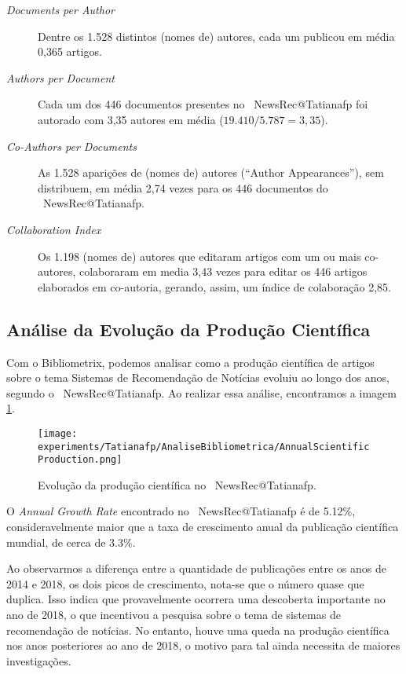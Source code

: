 \begin{description}
    \item [\textit{Documents per Author}] Dentre os 1.528 distintos (nomes de) autores, cada um publicou em média 0,365 artigos.
    \item [\textit{Authors per Document}] Cada um dos 446 documentos presentes no \dataset\   NewsRec@Tatianafp foi autorado com 3,35 autores em média ($19.410 / 5.787 = 3,35$).
    \item [\textit{Co-Authors per Documents}] As 1.528 aparições de (nomes de) autores (``Author Appearances''), sem distribuem, em média 2,74 vezes para os 446 documentos do \dataset\  NewsRec@Tatianafp.
    \item [\textit{Collaboration Index}] Os 1.198 (nomes de) autores que editaram artigos com um ou mais co-autores, colaboraram em media 3,43 vezes para editar os 446 artigos elaborados em co-autoria, gerando, assim, um índice de colaboração 2,85. 
\end{description}

\subsection{Análise da Evolução da Produção Científica}

Com o Bibliometrix, podemos analisar como a produção científica de artigos sobre o tema Sistemas de Recomendação de Notícias evoluiu ao longo dos anos, segundo o \dataset\  NewsRec@Tatianafp. Ao realizar essa análise, encontramos a imagem \ref{fig:evol_anual_NewsRec_Tatianafp}. 

\begin{figure}
    \centering
    \texttt{[image: experiments/Tatianafp/AnaliseBibliometrica/AnnualScientificProduction.png]}
    \caption{Evolução da produção científica no \dataset\  NewsRec@Tatianafp.}
    \label{fig:evol_anual_NewsRec_Tatianafp}
\end{figure}

O \textit{Annual Growth Rate} encontrado no \dataset\  NewsRec@Tatianafp é de 5.12\%, consideravelmente maior que a taxa de crescimento anual da publicação científica mundial, de cerca de 3.3\%.

Ao observarmos a diferença entre a quantidade de publicações entre os anos de 2014 e 2018, os dois picos de crescimento, nota-se que o número quase que duplica. Isso indica que provavelmente ocorrera uma descoberta importante no ano de 2018, o que incentivou a pesquisa sobre o tema de sistemas de recomendação de notícias. No entanto, houve uma queda na produção científica nos anos posteriores ao ano de 2018, o motivo para tal ainda necessita de maiores investigações.  

